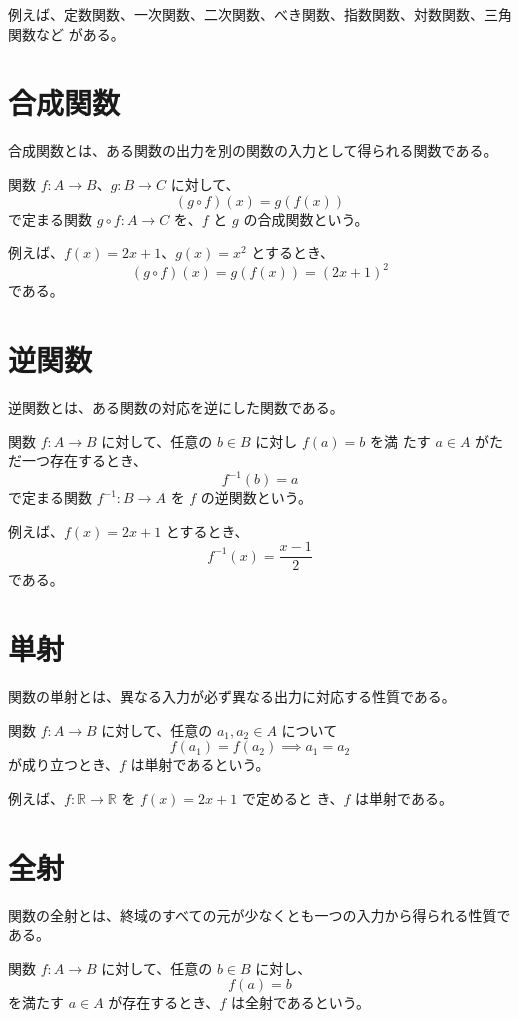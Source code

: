\documentclass[11pt]{ltjsreport}
\begin{document}
例えば、定数関数、一次関数、二次関数、べき関数、指数関数、対数関数、三角関数など
がある。

\section{合成関数}

合成関数とは、ある関数の出力を別の関数の入力として得られる関数である。

関数 \( f : A \to B \)、\( g : B \to C \) に対して、
\[
   (g \circ f)(x) = g(f(x))
\]
で定まる関数 \( g \circ f : A \to C \) を、\( f \) と \( g \) の合成関数という。

例えば、\( f(x) = 2x + 1 \)、\( g(x) = x^2 \) とするとき、
\[
   (g \circ f)(x) = g(f(x)) = (2x + 1)^2
\]
である。

\section{逆関数}

逆関数とは、ある関数の対応を逆にした関数である。

関数 \( f : A \to B \) に対して、任意の \( b \in B \) に対し \( f(a) = b \) を満
たす \( a \in A \) がただ一つ存在するとき、
\[
   f^{-1}(b) = a
\]
で定まる関数 \( f^{-1} : B \to A \) を \( f \) の逆関数という。

例えば、\( f(x) = 2x + 1 \) とするとき、
\[
   f^{-1}(x) = \frac{x - 1}{2}
\]
である。

\section{単射}

関数の単射とは、異なる入力が必ず異なる出力に対応する性質である。

関数 \( f : A \to B \) に対して、任意の \( a_1, a_2 \in A \) について
\[
   f(a_1) = f(a_2) \implies a_1 = a_2
\]
が成り立つとき、\( f \) は単射であるという。

例えば、\( f : \mathbb{R} \to \mathbb{R} \) を \( f(x) = 2x + 1 \) で定めると
き、\( f \) は単射である。

\section{全射}

関数の全射とは、終域のすべての元が少なくとも一つの入力から得られる性質である。

関数 \( f : A \to B \) に対して、任意の \( b \in B \) に対し、
\[
   f(a) = b
\]
を満たす \( a \in A \) が存在するとき、\( f \) は全射であるという。
\end{document}
